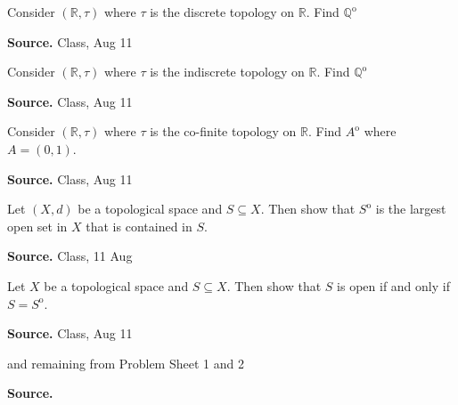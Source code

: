 \documentclass[12pt,twoside]{report}
\newenvironment*{source}{\hfill\scriptsize\textbf{Source.}\space}{\par}
\begin{document}
\begin{samepage}
\begin{ex}
Consider $\left (\mathbb{R}, \tau\right )$ where $\tau$ is the discrete topology on $\mathbb{R}$.
Find $\mathbb{Q} ^\mathrm{o}$
\end{ex}
\begin{source}
Class, Aug 11
\end{source}
\end{samepage}

\begin{samepage}
\begin{ex}
Consider $\left (\mathbb{R}, \tau\right )$ where $\tau$ is the indiscrete topology on $\mathbb{R}$.
Find $\mathbb{Q} ^\mathrm{o}$
\end{ex}
\begin{source}
Class, Aug 11
\end{source}
\end{samepage}

\begin{samepage}
\begin{ex}
Consider $\left (\mathbb{R}, \tau\right )$ where $\tau$ is the co-finite topology on $\mathbb{R}$.
Find $A^\mathrm{o}$ where $A = \left (0,1\right )$.
\end{ex}
\begin{source}
Class, Aug 11
\end{source}
\end{samepage}

\begin{samepage}
\begin{ex}
Let $\left (X,d\right )$ be a topological space and $S \subseteq X$. Then show that $S ^\mathrm{o}$ is the largest open set in $X$ that is contained in $S$.
\end{ex}
\begin{source}
Class, 11 Aug
\end{source}
\end{samepage}

\begin{samepage}
\begin{ex}
Let $X$ be a topological space and $S \subseteq X$. Then show that $S$ is open if and only if $S = S ^\mathrm{o}$.
\end{ex}
\begin{source}
Class, Aug 11
\end{source}
\end{samepage}

\begin{samepage}
\begin{ex}
 and remaining from Problem Sheet 1 and 2
\end{ex}
\begin{source}
\end{source}
\end{samepage}
\end{document}
